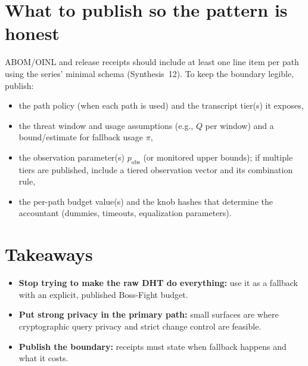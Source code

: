 \documentclass[11pt]{article}
\begin{document}
\section{What to publish so the pattern is honest}
ABOM/OINL and release receipts should include at least one line item per path using the series' minimal schema (Synthesis~12).\cite{series:receiptitems}
To keep the boundary legible, publish:
\begin{itemize}[leftmargin=1.2em]
\item the path policy (when each path is used) and the transcript tier(s) it exposes,
\item the threat window and usage assumptions (e.g., $Q$ per window) and a bound/estimate for fallback usage $\pi$,
\item the observation parameter(s) $p_{\mathrm{obs}}$ (or monitored upper bounds); if multiple tiers are published, include a tiered observation vector and its combination rule,\cite{series:obsatten,series:tieredobs}
\item the per-path budget value(s) and the knob hashes that determine the accountant (dummies, timeouts, equalization parameters).
\end{itemize}

\section{Takeaways}
\begin{itemize}[leftmargin=*]
\item \textbf{Stop trying to make the raw DHT do everything:} use it as a fallback with an explicit, published Boss-Fight budget.
\item \textbf{Put strong privacy in the primary path:} small surfaces are where cryptographic query privacy and strict change control are feasible.
\item \textbf{Publish the boundary:} receipts must state when fallback happens and what it costs.
\end{itemize}
\end{document}
